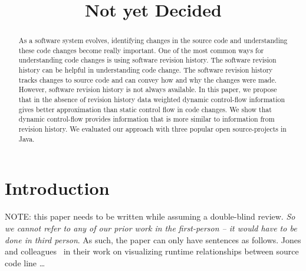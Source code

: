 \documentclass[conference]{IEEEtran}
\begin{document}
\title{Not yet Decided}

\author{
}

\maketitle


\begin{abstract}
As a software system evolves, identifying changes in the source code and understanding these code changes become really important. One of the most common ways for understanding code changes is using software revision history. The software revision history can be helpful in understanding code change. The software revision history tracks changes to source code and can convey how and why the changes were made. However, software revision history is not always available. In this paper, we propose that in the absence of revision history data weighted dynamic control-flow information gives better approximation than static control flow in code changes. We show that dynamic control-flow provides information that is more similar to information from revision history. We evaluated our approach with three popular open source-projects in Java. 
\end{abstract}



\section{Introduction}

NOTE: this paper needs to be written while assuming a double-blind review. \emph{So we cannot refer to any of our prior work in the first-person -- it would have to be done in third person}. As such, the paper can only have sentences as follows. Jones and colleagues~\cite{palepu13sep,palepu2015revealing,deng11sep} in their work on visualizing runtime relationships between source code line \ldots
\end{document}
